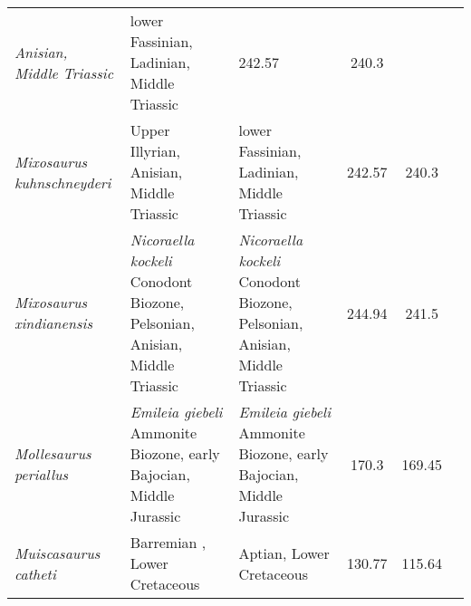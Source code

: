 \begin{longtabu}{>{\itshape}lXXSSl}
        Anisian, Middle Triassic
                                                             & lower Fassinian,
        Ladinian, Middle Triassic
                                                             & 242.57
                                                             & 240.3
                                                             &
                                                             \cite{Repossi1902ADSISNEMCSNM,McGowan2003HoP} \\        
	Mixosaurus kuhnschneyderi                            & Upper Illyrian,
        Anisian, Middle Triassic
                                                             & lower Fassinian,
        Ladinian, Middle Triassic
                                                             & 242.57
                                                             & 240.3
                                                             &
                                                             \cite{Brinkmann1998NJFGPA} \\                  
	Mixosaurus xindianensis                              & \emph{Nicoraella
        kockeli} Conodont Biozone, Pelsonian, Anisian, Middle Triassic
                                                             & \emph{Nicoraella
        kockeli} Conodont Biozone, Pelsonian, Anisian, Middle Triassic
                                                             & 244.94
                                                             & 241.5
                                                             & \cite{Chen2010APS} \\                       
	Mollesaurus periallus                                & \emph{Emileia
        giebeli} Ammonite Biozone, early Bajocian, Middle Jurassic
                                                             & \emph{Emileia
        giebeli} Ammonite Biozone, early Bajocian, Middle Jurassic
                                                             & 170.3
                                                             & 169.45
                                                             &
                                                             \cite{Fernandez2014GM,Fernandez1999JP} \\    
	Muiscasaurus catheti                                 & Barremian , Lower
        Cretaceous
                                                             & Aptian, Lower
        Cretaceous
                                                             & 130.77
                                                             & 115.64

\end{longtabu}
